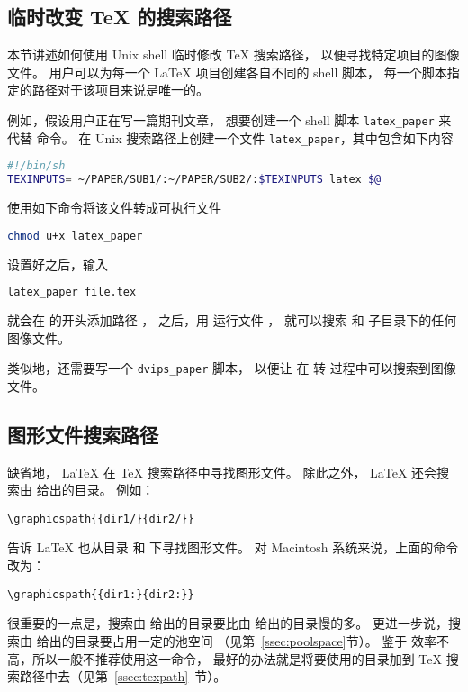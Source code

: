\subsection{临时改变 \TeX{} 的搜索路径}\label{ssec:temptexpath}

本节讲述如何使用 Unix shell 临时修改 \TeX{} 搜索路径，
以便寻找特定项目的图像文件。
用户可以为每一个 \LaTeX{} 项目创建各自不同的 shell 脚本，
每一个脚本指定的路径对于该项目来说是唯一的。

例如，假设用户正在写一篇期刊文章，
想要创建一个 shell 脚本 \verb|latex_paper| 来代替  命令。
在 Unix 搜索路径上创建一个文件 \verb|latex_paper|，其中包含如下内容
\begin{lstlisting}[language=sh]
#!/bin/sh
TEXINPUTS= ~/PAPER/SUB1/:~/PAPER/SUB2/:$TEXINPUTS latex $@
\end{lstlisting}
使用如下命令将该文件转成可执行文件
\begin{lstlisting}[language=sh]
chmod u+x latex_paper
\end{lstlisting}

设置好之后，输入
\begin{lstlisting}[language=sh]
latex_paper file.tex
\end{lstlisting}
就会在  的开头添加路径 ，
之后，用  运行文件 ，
就可以搜索  和  子目录下的任何图像文件。

类似地，还需要写一个 \verb|dvips_paper| 脚本，
以便让  在  转  过程中可以搜索到图像文件。

\subsection{图形文件搜索路径}\label{ssec:graphpath}
缺省地， \LaTeX{} 在 \TeX{} 搜索路径中寻找图形文件。
除此之外， \LaTeX{} 还会搜索由  给出的目录。
例如：
\begin{lstlisting}
\graphicspath{{dir1/}{dir2/}}
\end{lstlisting}
告诉 \LaTeX{} 也从目录  和  下寻找图形文件。
对 Macintosh 系统来说，上面的命令改为：
\begin{lstlisting}
\graphicspath{{dir1:}{dir2:}}
\end{lstlisting}

很重要的一点是，搜索由  给出的目录要比由  给出的目录慢的多。
更进一步说，搜索由  给出的目录要占用一定的池空间
（见第~\ref{ssec:poolspace}节）。
鉴于  效率不高，所以一般不推荐使用这一命令，
最好的办法就是将要使用的目录加到 \TeX{} 搜索路径中去（见第~\ref{ssec:texpath}~节）。


